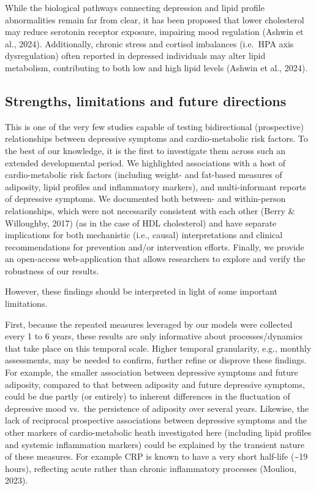 \documentclass[
  letterpaper,
  DIV=11,
  numbers=noendperiod]{scrreport}
\begin{document}
While the biological pathways connecting depression and lipid profile
abnormalities remain far from clear, it has been proposed that lower
cholesterol may reduce serotonin receptor exposure, impairing mood
regulation (Ashwin et al., 2024). Additionally, chronic stress and
cortisol imbalances (i.e.~HPA axis dysregulation) often reported in
depressed individuals may alter lipid metabolism, contributing to both
low and high lipid levels (Ashwin et al., 2024).

\subsection{Strengths, limitations and future
directions}\label{strengths-limitations-and-future-directions}

This is one of the very few studies capable of testing bidirectional
(prospective) relationships between depressive symptoms and
cardio-metabolic risk factors. To the best of our knowledge, it is the
first to investigate them across such an extended developmental period.
We highlighted associations with a host of cardio-metabolic risk factors
(including weight- and fat-based measures of adiposity, lipid profiles
and inflammatory markers), and multi-informant reports of depressive
symptoms. We documented both between- and within-person relationships,
which were not necessarily consistent with each other (Berry \&
Willoughby, 2017) (as in the case of HDL cholesterol) and have separate
implications for both mechanistic (i.e., causal) interpretations and
clinical recommendations for prevention and/or intervention efforts.
Finally, we provide an open-access web-application that allows
researchers to explore and verify the robustness of our results.

However, these findings should be interpreted in light of some important
limitations.

First, because the repeated measures leveraged by our models were
collected every 1 to 6 years, these results are only informative about
processes/dynamics that take place on this temporal scale. Higher
temporal granularity, e.g., monthly assessments, may be needed to
confirm, further refine or disprove these findings. For example, the
smaller association between depressive symptoms and future adiposity,
compared to that between adiposity and future depressive symptoms, could
be due partly (or entirely) to inherent differences in the fluctuation
of depressive mood vs.~the persistence of adiposity over several years.
Likewise, the lack of reciprocal prospective associations between
depressive symptoms and the other markers of cardio-metabolic heath
investigated here (including lipid profiles and systemic inflammation
markers) could be explained by the transient nature of these measures.
For example CRP is known to have a very short half-life
(\textasciitilde19 hours), reflecting acute rather than chronic
inflammatory processes (Mouliou, 2023).
\end{document}
